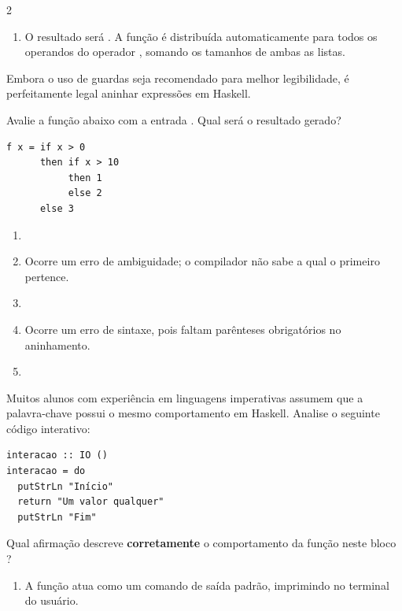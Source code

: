 \documentclass[a4paper,10pt,brazil]{article}
\begin{document}
\begin{multicols}{2}
\begin{enumerate}
  \item O resultado será . A função  é distribuída automaticamente para todos os operandos do operador \haskellinline{++}, somando os tamanhos de ambas as listas.


\end{enumerate}

Embora o uso de guardas seja recomendado para melhor legibilidade, é perfeitamente legal aninhar expressões  em Haskell. 

Avalie a função abaixo com a entrada . Qual será o resultado gerado?
\begin{verbatim}
f x = if x > 0
      then if x > 10
           then 1
           else 2
      else 3
\end{verbatim}

\begin{enumerate}
  \item {}

  \item Ocorre um erro de ambiguidade; o compilador não sabe a qual  o primeiro  pertence.

  \item {}

  \item Ocorre um erro de sintaxe, pois faltam parênteses obrigatórios no aninhamento.

  \item {}


\end{enumerate}

Muitos alunos com experiência em linguagens imperativas assumem que a palavra-chave  possui o mesmo comportamento em Haskell. Analise o seguinte código interativo:

\begin{verbatim}
interacao :: IO ()
interacao = do
  putStrLn "Início"
  return "Um valor qualquer"
  putStrLn "Fim"
\end{verbatim}

Qual afirmação descreve \textbf{corretamente} o comportamento da função  neste bloco ?

\begin{enumerate}
  \item A função  atua como um comando de saída padrão, imprimindo  no terminal do usuário.


\end{enumerate}
\end{multicols}
\end{document}
